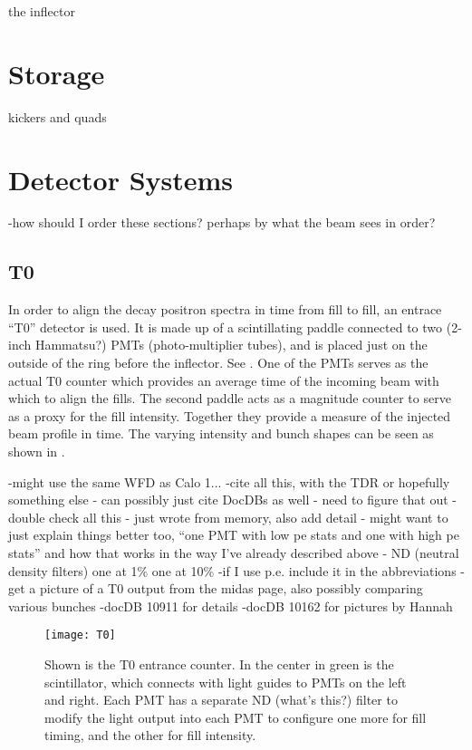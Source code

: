 the inflector



\section{Storage}
\label{sec:Storage}

kickers and quads





\section{Detector Systems}
\label{sec:DetectorSystems}

-how should I order these sections? perhaps by what the beam sees in order?

\subsection{T0}
\label{sec:T0}

In order to align the decay positron spectra in time from fill to fill, an entrace ``T0'' detector is used.  It is made up of a scintillating paddle connected to two (2-inch Hammatsu?) PMTs (photo-multiplier tubes), and is placed just on the outside of the ring before the inflector. See . One of the PMTs serves as the actual T0 counter which provides an average time of the incoming beam with which to align the fills. The second paddle acts as a magnitude counter to serve as a proxy for the fill intensity. Together they provide a measure of the injected beam profile in time. The varying intensity and bunch shapes can be seen as shown in .

-might use the same WFD as Calo 1...
-cite all this, with the TDR or hopefully something else \cite{TDR} - can possibly just cite DocDBs as well - need to figure that out
-double check all this - just wrote from memory, also add detail - might want to just explain things better too, ``one PMT with low pe stats and one with high pe stats'' and how that works in the way I've already described above - ND (neutral density filters) one at 1\% one at 10\%
-if I use p.e. include it in the abbreviations
-get a picture of a T0 output from the midas page, also possibly comparing various bunches
-docDB 10911 for details
-docDB 10162 for pictures by Hannah


\begin{figure}[]
    \centering
    \texttt{[image: T0]}
    \caption[T0 Counter]{Shown is the T0 entrance counter. In the center in green is the scintillator, which connects with light guides to PMTs on the left and right. Each PMT has a separate ND (what's this?) filter to modify the light output into each PMT to configure one more for fill timing, and the other for fill intensity.}
    \label{fig:T0}
\end{figure}

